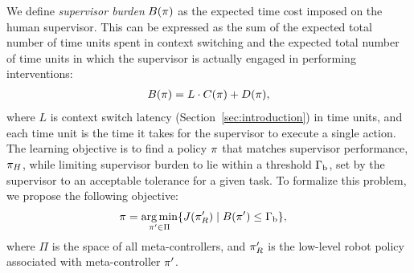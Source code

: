 We define \emph{supervisor burden} $B(\pi)$ as the expected time cost imposed on the human supervisor. This can be expressed as the sum of the expected total number of time units spent in context switching and the expected total number of time units in which the supervisor is actually engaged in performing interventions:%
\begin{align}
    \label{eq:burden}
        B(\pi) = L \cdot C(\pi) + D(\pi),
\end{align}
where $L$ is context switch latency (Section~\ref{sec:introduction}) in time units, and each time unit is the time it takes for the supervisor to execute a single action. The learning objective is to find a policy $\pi$ that matches supervisor performance, $\pi_{H}$, while limiting supervisor burden to lie within a threshold $\Gamma_{\rm b}$, set by the supervisor to an acceptable tolerance for a given task. To formalize this problem, we propose the following objective: 
\begin{align}
\begin{split}
    \label{eq:LazyDAgger-objective}
    \pi &= \operatorname*{arg\,min}_{\pi' \in \Pi}\{ J(\pi_{R}')
    \mid B(\pi') \leq \Gamma_{\rm b}\},
\end{split}
\end{align}
where $\Pi$ is the space of all meta-controllers, and $\pi_{R}'$ is the low-level robot policy associated with meta-controller $\pi'$. 


